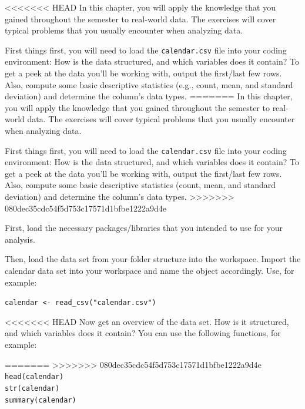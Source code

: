 \documentclass[
  11pt,
]{article}
\newenvironment{tips}[1]
  {
  \begin{itemize}
  \footnotesize
  \renewcommand{\labelitemi}{
    \raisebox{-.7\height}[0pt][0pt]{
      {\setkeys{Gin}{width=3em,keepaspectratio}
        \texttt{[image: images/\#1.png]}}
    }
  }
  \setlength{\fboxsep}{1em}
  \begin{rbox}
  \item
  }
  {
  \end{rbox}
  \end{itemize}
  }
\begin{document}
<<<<<<< HEAD
In this chapter, you will apply the knowledge that you gained throughout the semester to real-world data.
The exercises will cover typical problems that you usually encounter when analyzing data.

First things first, you will need to load the \texttt{calendar.csv} file into your coding environment: How is the data structured, and which variables does it contain?
To get a peek at the data you'll be working with, output the first/last few rows.
Also, compute some basic descriptive statistics (e.g., count, mean, and standard deviation) and determine the column's data types.
=======
In this chapter, you will apply the knowledge that you gained throughout the semester to real-world data. The exercises will cover typical problems that you usually encounter when analyzing data.

First things first, you will need to load the \texttt{calendar.csv} file into your coding environment: How is the data structured, and which variables does it contain? To get a peek at the data you'll be working with, output the first/last few rows. Also, compute some basic descriptive statistics (count, mean, and standard deviation) and determine the column's data types.
>>>>>>> 080dec35cdc54f5d753c17571d1bfbe1222a9d4e

\begin{tips}r
First, load the necessary packages/libraries that you intended to use for your analysis.

Then, load the data set from your folder structure into the workspace.
Import the calendar data set into your workspace and name the object accordingly.
Use, for example:

\texttt{calendar\ \textless{}-\ read\_csv("calendar.csv")}

<<<<<<< HEAD
Now get an overview of the data set.
How is it structured, and which variables does it contain?
You can use the following functions, for example:

=======
>>>>>>> 080dec35cdc54f5d753c17571d1bfbe1222a9d4e
\texttt{head(calendar)}~\\
\texttt{str(calendar)}~\\
\texttt{summary(calendar)}

\end{tips}
\end{document}
